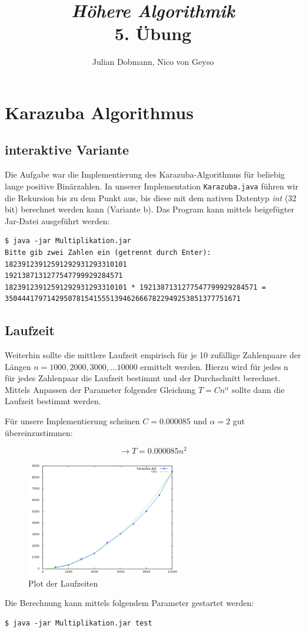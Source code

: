 \documentclass[a4paper,10pt]{scrartcl}
\title{\textit{Höhere Algorithmik}\\ 5. Übung}
\author{Julian Dobmann, Nico von Geyso}
\begin{document}
\maketitle

\section{Karazuba Algorithmus}

\subsection{interaktive Variante}

Die Aufgabe war die Implementierung des Karazuba-Algorithmus für beliebig lange
positive Binärzahlen. In unserer Implementation \texttt{Karazuba.java} führen
wir die Rekursion bis zu dem Punkt aus, bis diese mit dem nativen Datentyp
\textit{int} (32 bit) berechnet werden kann (Variante b). Das Program kann
mittels beigefügter Jar-Datei ausgeführt werden:

\begin{verbatim}$ java -jar Multiplikation.jar
Bitte gib zwei Zahlen ein (getrennt durch Enter):
18239123912591292931293310101
1921387131277547799929284571
18239123912591292931293310101 * 1921387131277547799929284571 =
35044417971429507815415551394626667822949253851377751671\end{verbatim}

\subsection{Laufzeit}

Weiterhin sollte die mittlere Laufzeit empirisch für je 10 zufällige Zahlenpaare der
Längen $n = 1000, 2000, 3000, ... 10000$ ermittelt werden. Hierzu wird für jedes
n für jedes Zahlenpaar die Laufzeit bestimmt und der Durchschnitt berechnet.
Mittels Anpassen der Parameter folgender Gleichung $T = Cn^\alpha$ sollte dann
die Laufzeit bestimmt werden.

Für unsere Implementierung scheinen $C=0.000085$ und $\alpha=2$ gut
übereinzustimmen:

$$\rightarrow T = 0.000085 n^2$$

\newpage

\begin{figure}[ht!]
  \centering
  \includegraphics[width=0.6\textwidth]{plot.png}
  \caption{Plot der Laufzeiten}
\end{figure}

Die Berechnung kann mittels folgendem Parameter gestartet werden:

\begin{verbatim}$ java -jar Multiplikation.jar test\end{verbatim}
\end{document}
